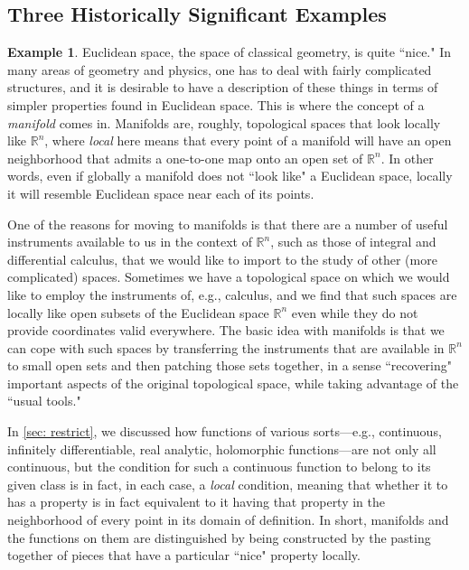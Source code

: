 \documentclass[a4paper]{book}
\theoremstyle{definition}
\newtheorem{example}{Example}[section]
\theoremstyle{definition}
\theoremstyle{definition}
\theoremstyle{theorem}
\theoremstyle{definition}
\begin{document}
\subsection{Three Historically Significant Examples}
\begin{example}\label{example: manifold}
	Euclidean space, the space of classical geometry, is quite ``nice." In many areas of geometry and physics, one has to deal with fairly complicated structures, and it is desirable to have a description of these things in terms of simpler properties found in Euclidean space. This is where the concept of a \textit{manifold} comes in. Manifolds are, roughly, topological spaces that look locally like $\mathbb{R}^n$, where \textit{local} here means that every point of a manifold will have an open neighborhood that admits a one-to-one map onto an open set of $\mathbb{R}^n$. In other words, even if globally a manifold does not ``look like" a Euclidean space, locally it will resemble Euclidean space near each of its points.  \par 
	One of the reasons for moving to manifolds is that there are a number of useful instruments available to us in the context of $\mathbb{R}^n$, such as those of integral and differential calculus, that we would like to import to the study of other (more complicated) spaces. Sometimes we have a topological space on which we would like to employ the instruments of, e.g., calculus, and we find that such spaces are locally like open subsets of the Euclidean space $\mathbb{R}^n$ even while they do not provide coordinates valid everywhere. The basic idea with manifolds is that we can cope with such spaces by transferring the instruments that are available in $\mathbb{R}^n$ to small open sets and then patching those sets together, in a sense ``recovering" important aspects of the original topological space, while taking advantage of the ``usual tools." \par 
	In \ref{sec: restrict}, we discussed how functions of various sorts---e.g., continuous, infinitely differentiable, real analytic, holomorphic functions---are not only all continuous, but the condition for such a continuous function to belong to its given class is in fact, in each case, a \textit{local} condition, meaning that whether it to has a property is in fact equivalent to it having that property in the neighborhood of every point in its domain of definition. In short, manifolds and the functions on them are distinguished by being constructed by the pasting together of pieces that have a particular ``nice" property locally. \par 

\end{example}
\end{document}
